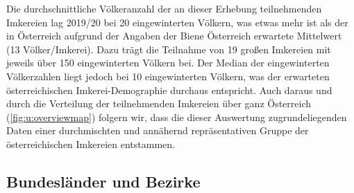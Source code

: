 \newline
Die durchschnittliche Völkeranzahl der an dieser Erhebung teilnehmenden Imkereien lag 2019/20 bei 20 eingewinterten Völkern, was etwas mehr ist als der in Österreich aufgrund der Angaben der Biene Österreich erwartete Mittelwert (13 Völker/Imkerei). Dazu trägt die Teilnahme von 19 großen Imkereien mit jeweils über 150 eingewinterten Völkern bei. Der Median der eingewinterten Völkerzahlen liegt jedoch bei 10 eingewinterten Völkern, was der erwarteten österreichischen Imkerei-Demographie durchaus entspricht. Auch daraus und durch die Verteilung der teilnehmenden Imkereien über ganz Österreich (\cref{fig:u:overviewmap}) folgern wir, dass die dieser Auswertung zugrundeliegenden Daten einer durchmischten und annähernd repräsentativen Gruppe der österreichischen Imkereien entstammen.

\subsection{Bundesländer und Bezirke}

